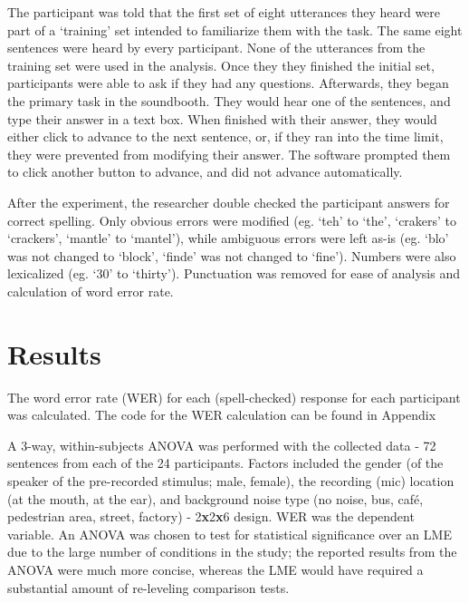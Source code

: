 The participant was told that the first set of eight utterances they heard were part of a `training' set intended to familiarize them with the task. The same eight sentences were heard by every participant.  None of the utterances from the training set were used in the analysis.  Once they they finished the initial set, participants were able to ask if they had any questions.  Afterwards, they began the primary task in the soundbooth.  They would hear one of the sentences, and type their answer in a text box.  When finished with their answer, they would either click to advance to the next sentence, or, if they ran into the time limit, they were prevented from modifying their answer.  The software prompted them to click another button to advance, and did not advance automatically.

After the experiment, the researcher double checked the participant answers for correct spelling.  Only obvious errors were modified (eg. `teh' to `the', `crakers' to `crackers', `mantle' to `mantel'), while ambiguous errors were left as-is (eg. `blo' was not changed to `block', `finde' was not changed to `fine').  Numbers were also lexicalized (eg. `30' to `thirty').  Punctuation was removed for ease of analysis and calculation of word error rate.
\DIFdelbegin {}\DIFdelend 


\section{Results}
\label{chap3:results}


\DIFdelend The word error rate (WER) for each (spell-checked) response for each participant was calculated. The code for the WER calculation can be found in Appendix \DIFdelbegin {}\DIFdelend \DIFaddbegin {}\DIFaddend 

A 3-way, within-subjects ANOVA was performed with the collected data - 72 sentences from each of the 24 participants. Factors included the gender (of the speaker of the pre-recorded stimulus; male, female), the recording (mic) location (at the mouth, at the ear), and background noise type (no noise, bus, caf\'{e}, pedestrian area, street, factory) - 2\textbf{x}2\textbf{x}6 design.  WER was the dependent variable.  An ANOVA was chosen to test for statistical significance over an LME due to the large number of conditions in the study; the reported results from the ANOVA were much more concise, whereas the LME would have required a substantial amount of re-leveling comparison tests.  

